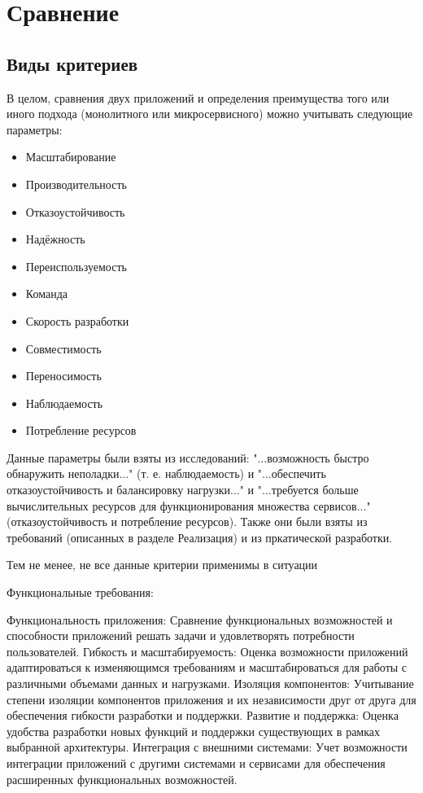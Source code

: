 \section{Сравнение}

\subsection{Виды критериев}
    В целом, сравнения двух приложений и определения преимущества того или иного подхода (монолитного или микросервисного) можно учитывать следующие параметры:

    \begin{itemize}
        \item Масштабирование
        \item Производительность
        \item Отказоустойчивость
        \item Надёжность
        \item Переиспользуемость
        \item Команда
        \item Скорость разработки
        \item Совместимость
        \item Переносимость
        \item Наблюдаемость
        \item Потребление ресурсов
    \end{itemize}

    Данные параметры были взяты из исследований: "...возможность быстро обнаружить неполадки..." \cite{шитько2017проектирование} (т. е. наблюдаемость) и "...обеспечить отказоустойчивость и балансировку нагрузки..." и "...требуется больше вычислительных ресурсов для функционирования множества сервисов..." \cite{артамонов2016разработка} (отказоустойчивость и потребление ресурсов). Также они были взяты из требований (описанных в разделе Реализация) и из пркатической разработки.

    Тем не менее, не все данные критерии применимы в ситуации








Функциональные требования:

    Функциональность приложения: Сравнение функциональных возможностей и способности приложений решать задачи и удовлетворять потребности пользователей.
    Гибкость и масштабируемость: Оценка возможности приложений адаптироваться к изменяющимся требованиям и масштабироваться для работы с различными объемами данных и нагрузками.
    Изоляция компонентов: Учитывание степени изоляции компонентов приложения и их независимости друг от друга для обеспечения гибкости разработки и поддержки.
    Развитие и поддержка: Оценка удобства разработки новых функций и поддержки существующих в рамках выбранной архитектуры.
    Интеграция с внешними системами: Учет возможности интеграции приложений с другими системами и сервисами для обеспечения расширенных функциональных возможностей.

